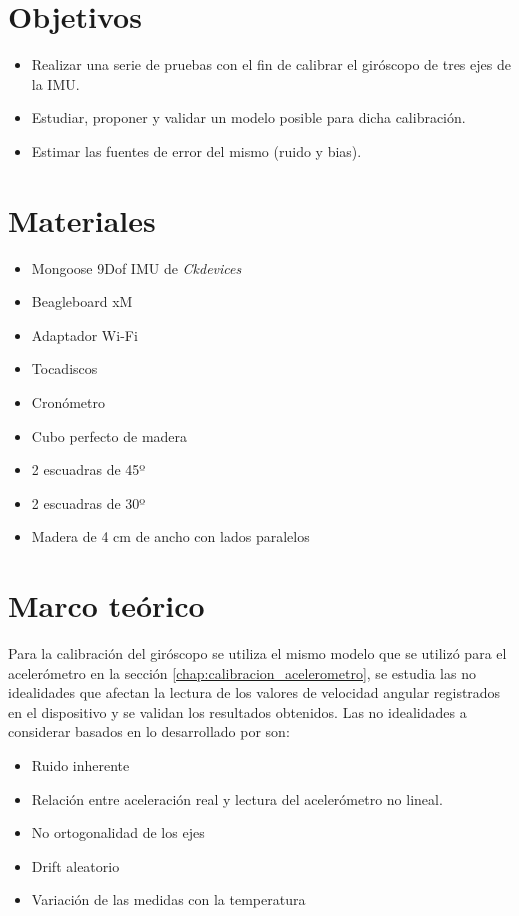 \documentclass[spanish,12pt,a4paper,titlepage]{report}
\begin{document}
\section{Objetivos}

\begin{itemize}
	\item Realizar una serie de pruebas con el fin de calibrar el giróscopo de tres ejes de la IMU.
	\item Estudiar, proponer y validar un modelo posible para dicha calibración.
	\item Estimar las fuentes de error del mismo (ruido y bias).
\end{itemize}

\section{Materiales}
\begin{itemize}
\item Mongoose 9Dof IMU de \emph{Ckdevices}
\item Beagleboard xM
\item Adaptador Wi-Fi 
\item Tocadiscos
\item Cronómetro
\item Cubo perfecto de madera
\item 2 escuadras de 45º
\item 2 escuadras de 30º
\item Madera de 4 cm de ancho con lados paralelos
\end{itemize}

\section{Marco teórico}
Para la calibración del giróscopo se utiliza el mismo modelo que se utilizó para el acelerómetro en la sección \ref{chap:calibracion_acelerometro}, se estudia las no idealidades que afectan la lectura de los valores de velocidad angular registrados en el dispositivo y se validan los resultados obtenidos. Las no idealidades  a considerar basados en lo desarrollado por \cite{bib:calib_IMU} son:

\begin{itemize}
\item Ruido inherente
\item Relación entre aceleración real y lectura del acelerómetro no lineal.
\item No ortogonalidad de los ejes
\item Drift aleatorio
\item Variación de las medidas con la temperatura
\end{itemize}
\end{document}
